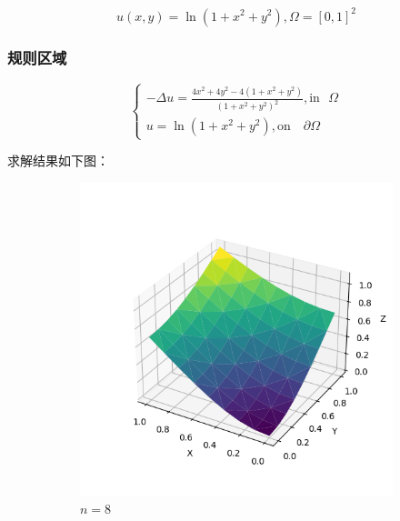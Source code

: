 \documentclass[lang=cn,a4paper,newtx,bibend=bibtex]{elegantpaper}
\begin{document}
\[
  u(x, y) = \ln (1 + x^2 + y^2), \Omega = [0, 1]^2
\]


\subsubsection{规则区域}


\[
\begin{cases}
  - \Delta u = \frac{4x^2 + 4y^2 - 4(1 + x^2 + y^2)}{(1 + x^2 + y^2)^2}, \text{in~~} \Omega\\
  u = \ln (1 + x^2 + y^2), \text{on ~~} \partial \Omega
\end{cases}
\]

求解结果如下图：

\begin{figure}[H]
  \centering
  \begin{subfigure}[b]{0.18\textwidth}
      \includegraphics[width=\textwidth]{../../res_bac/res-[data|3-Dirichlet-regular-a8].png}
      \caption{$n =  8$}
  \end{subfigure}
  \hfill
  \begin{subfigure}[b]{0.18\textwidth}

\end{subfigure}
\end{figure}
\end{document}
